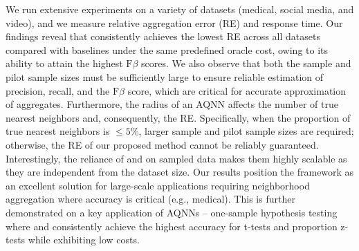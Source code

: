  We run extensive experiments on a variety of datasets (medical, social media, and video), and we measure relative aggregation error (RE) and response time. Our findings reveal that \sprintv consistently achieves the lowest RE across all datasets compared with baselines under the same predefined oracle cost, owing to its ability to attain the highest \(\text{F}{\beta}\) scores. We also observe that both the sample and pilot sample sizes must be sufficiently large to ensure reliable estimation of precision, recall, and the \(\text{F}{\beta}\) score, which are critical for accurate approximation of aggregates. Furthermore, the radius of an AQNN affects the number of true nearest neighbors and, consequently, the RE. Specifically, when the proportion of true nearest neighbors is \(\leq 5\%\), larger sample and pilot sample sizes are required; otherwise, the RE of our proposed method cannot be reliably guaranteed. Interestingly, the reliance of \sprintv and \sprintc on sampled data makes them highly scalable as they are independent from the dataset size. Our results position the \sprint framework as an excellent solution for large-scale applications requiring neighborhood aggregation where accuracy is critical (e.g., medical). This is further demonstrated on a key application of AQNNs -- one-sample hypothesis testing where \sprintv and \sprintc consistently achieve the highest accuracy for t-tests and proportion z-tests while exhibiting low costs.

